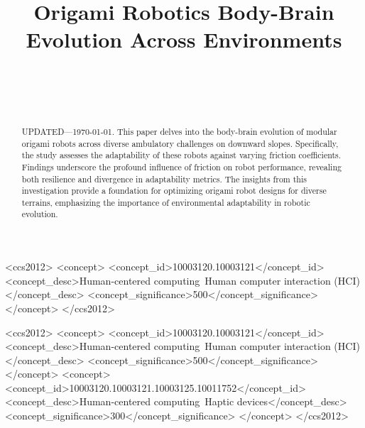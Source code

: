 \documentclass{sigchi}
\def\plaintitle{Origami Robotics Body-Brain Evolution Across Environments}
\begin{document}
\title{\plaintitle}

\author{%
  \\
  \\
  \\
}

\maketitle

\begin{abstract}
  UPDATED---\today. This paper delves into the body-brain evolution of modular origami robots across diverse ambulatory challenges on downward slopes. Specifically, the study assesses the adaptability of these robots against varying friction coefficients. Findings underscore the profound influence of friction on robot performance, revealing both resilience and divergence in adaptability metrics. The insights from this investigation provide a foundation for optimizing origami robot designs for diverse terrains, emphasizing the importance of environmental adaptability in robotic evolution. 
\end{abstract}



\begin{CCSXML}
<ccs2012>
<concept>
<concept_id>10003120.10003121</concept_id>
<concept_desc>Human-centered computing~Human computer interaction (HCI)</concept_desc>
<concept_significance>500</concept_significance>
</concept>
</ccs2012>
\end{CCSXML}


\begin{CCSXML}
<ccs2012>
<concept>
<concept_id>10003120.10003121</concept_id>
<concept_desc>Human-centered computing~Human computer interaction (HCI)</concept_desc>
<concept_significance>500</concept_significance>
</concept>
<concept>
<concept_id>10003120.10003121.10003125.10011752</concept_id>
<concept_desc>Human-centered computing~Haptic devices</concept_desc>
<concept_significance>300</concept_significance>
</concept>
</ccs2012>
\end{CCSXML}
\end{document}
